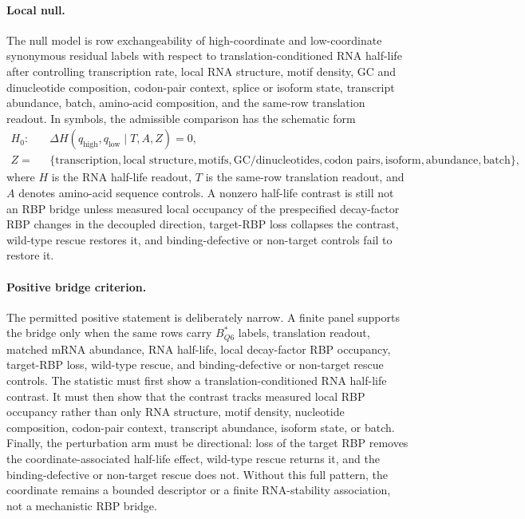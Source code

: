 \paragraph{Local null.}
The null model is row exchangeability of high-coordinate and low-coordinate synonymous residual labels with respect to translation-conditioned RNA half-life after controlling transcription rate, local RNA structure, motif density, GC and dinucleotide composition, codon-pair context, splice or isoform state, transcript abundance, batch, amino-acid composition, and the same-row translation readout.  In symbols, the admissible comparison has the schematic form
$$
\begin{aligned}
H_{0}:\quad
&\Delta H(q_{\mathrm{high}},q_{\mathrm{low}}\mid T,A,Z)=0,\\
Z={}&\{\text{transcription},\text{local structure},\text{motifs},\text{GC/dinucleotides},\text{codon pairs},\text{isoform},\text{abundance},\text{batch}\},
\end{aligned}
$$
where $H$ is the RNA half-life readout, $T$ is the same-row translation readout, and $A$ denotes amino-acid sequence controls.  A nonzero half-life contrast is still not an RBP bridge unless measured local occupancy of the prespecified decay-factor RBP changes in the decoupled direction, target-RBP loss collapses the contrast, wild-type rescue restores it, and binding-defective or non-target controls fail to restore it.

\paragraph{Positive bridge criterion.}
The permitted positive statement is deliberately narrow.  A finite panel supports the bridge only when the same rows carry $B^{\ast}_{Q6}$ labels, translation readout, matched mRNA abundance, RNA half-life, local decay-factor RBP occupancy, target-RBP loss, wild-type rescue, and binding-defective or non-target rescue controls.  The statistic must first show a translation-conditioned RNA half-life contrast.  It must then show that the contrast tracks measured local RBP occupancy rather than only RNA structure, motif density, nucleotide composition, codon-pair context, transcript abundance, isoform state, or batch.  Finally, the perturbation arm must be directional: loss of the target RBP removes the coordinate-associated half-life effect, wild-type rescue returns it, and the binding-defective or non-target rescue does not.  Without this full pattern, the coordinate remains a bounded descriptor or a finite RNA-stability association, not a mechanistic RBP bridge.

